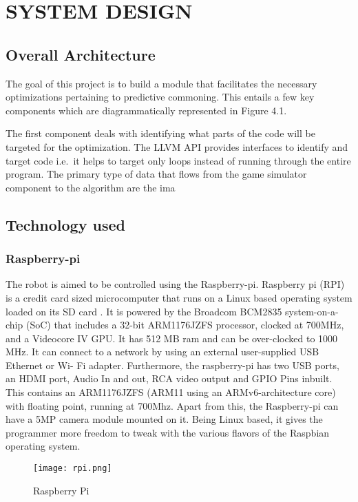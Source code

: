 \chapter{SYSTEM DESIGN} %

\section{Overall Architecture}
The goal of this project is to build a module that facilitates the necessary optimizations pertaining to predictive commoning. This entails a few key components which are diagrammatically represented in Figure 4.1.
\newline

The first component deals with identifying what parts of the code will be targeted for the optimization. The LLVM API provides interfaces to identify and target code i.e.\ it helps to target only loops instead of running through the entire program.
The primary type of data that flows from the game simulator component
to the algorithm are the ima


\section{Technology used}
\subsection{Raspberry-pi}
The robot is aimed to be controlled using the Raspberry-pi. Raspberry pi (RPI) is a credit card sized microcomputer that runs on a Linux based operating system loaded on its SD card . It is powered by the Broadcom BCM2835 system-on-a-chip (SoC) that includes a 32-bit ARM1176JZFS processor, clocked at 700MHz, and a Videocore IV GPU. It has 512 MB ram and can be over-clocked to 1000 MHz. It can connect to a network by using an external user-supplied USB Ethernet or Wi- Fi adapter. Furthermore, the raspberry-pi has two USB ports, an HDMI port, Audio In and out, RCA video output and GPIO Pins inbuilt. This contains an ARM1176JZFS (ARM11 using an ARMv6-architecture core) with floating point, running at 700Mhz. Apart from this, the Raspberry-pi can have a 5MP camera module mounted on it. Being Linux based, it gives the programmer more freedom to tweak with the various flavors of the Raspbian operating system.

\begin{figure}[H]
  \centering
  \texttt{[image: rpi.png]}
  \caption{Raspberry Pi}
  \label{RPi}	
\end{figure}

